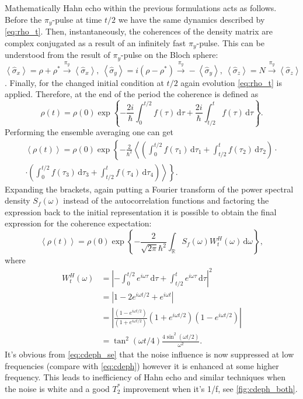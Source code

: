 \documentclass[12pt, twoside]{report}
\newcommand{\diff}{\,\mathrm{d}}
\numberwithin{equation}{section}
\begin{document}
Mathematically Hahn echo within the previous formulations acts as follows. Before the  $\pi_y$-pulse at time $t/2$ we have the same dynamics described by \eqref{eq:rho_t}. Then, instantaneously, the coherences of the density matrix are complex conjugated as a result of an infinitely fast $\pi_y$-pulse. This can be understood from the result of $\pi_y$-pulse on the Bloch sphere: $\left< \hat \sigma_x \right> = \rho + \rho^* \overset{\pi_y}{\rightarrow}  \left< \hat \sigma_x \right>,\ \left< \hat \sigma_y \right> = i(\rho - \rho^*) \overset{\pi_y}{\rightarrow} -\left< \hat \sigma_y \right>,\ \left< \hat \sigma_z \right> = N  \overset{\pi_y}{\rightarrow}  \left< \hat \sigma_z \right>$. Finally, for the changed initial condition at $t/2$ again evolution \eqref{eq:rho_t} is applied. Therefore, at the end of the period the coherence is defined as
\begin{equation*}
\rho(t) = \rho(0)\exp \left\{ - \frac{2i}{\hbar}\int_0^{t/2} f(\tau)  \diff \tau + \frac{2i}{\hbar}\int_{t/2}^{t} f(\tau)  \diff \tau \right\}.
\end{equation*}
Performing the ensemble averaging one can get
\begin{gather*}
\left<\rho(t)\right> = \rho(0)\exp \left\{ - \frac{2}{\hbar^2} \left< \left( \int_0^{t/2} f(\tau_1)  \diff \tau_1 + \int_{t/2}^{t} f(\tau_2)  \diff \tau_2 \right)\cdot \right. \right. \\
\cdot \left. \left. \left( \int_0^{t/2} f(\tau_3)  \diff \tau_3 + \int_{t/2}^{t} f(\tau_4)  \diff \tau_4 \right) \right> \right\}.
\end{gather*}
Expanding the brackets, again putting a Fourier transform of the power spectral density $S_f(\omega)$ instead of the autocorrelation functions and factoring the expression back to the initial representation it is possible to obtain\cite{Preskill} the final expression for the coherence expectation:
\begin{equation}
\left<\rho(t)\right> = \rho(0)\exp \left\{ - \frac{2}{\sqrt{2\pi} \hbar^2} \int_\mathbb{R} S_f(\omega) W^H_t (\omega) \diff\omega \right\},
\label{eq:cdeph_se}
\end{equation}
where
\begin{align*}
 W^H_t (\omega)  &= \left| - \int_0^{t/2} e^{i \omega \tau}\diff \tau + \int_{t/2}^{t} e^{i\omega\tau}  \diff \tau  \right|^2 \\
& =  \left| 1-2e^{i\omega t/2} + e^{i\omega t} \right| \\
&= \left| \frac{(1-e^{i\omega t/2})}{(1+e^{i\omega t/2})} (1+e^{i\omega t/2})(1-e^{i\omega t/2})\right|\\
& = \tan^2(\omega t/4)\frac{4 \sin^2(\omega t/2)}{\omega^2}.
\end{align*}
It's obvious from \eqref{eq:cdeph_se}  that the noise influence is now suppressed at low frequencies (compare with \eqref{eq:cdeph}) however it is enhanced at some higher frequency. This leads to inefficiency of Hahn echo and similar techniques when the noise is white and a good $T_2^*$ improvement when it's 1/f, see \autoref{fig:cdeph_both}.
\end{document}
